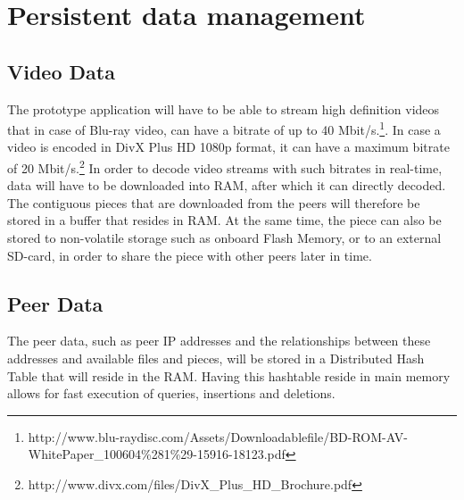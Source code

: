 \section{Persistent data management}
\label{sec:perdata}
\subsection{Video Data}
The prototype application will have to be able to stream high definition videos that in case of Blu-ray video, can have a bitrate of up to 40 Mbit/s.\footnote{http://www.blu-raydisc.com/Assets/Downloadablefile/BD-ROM-AV-WhitePaper_100604\%281\%29-15916-18123.pdf}. In case a video is encoded in DivX Plus HD 1080p format, it can have a maximum bitrate of 20 Mbit/s.\footnote{http://www.divx.com/files/DivX_Plus_HD_Brochure.pdf} In order to decode video streams with such bitrates in real-time, data will have to be downloaded into RAM, after which it can directly decoded. The contiguous pieces that are downloaded from the peers will therefore be stored in a buffer that resides in RAM. At the same time, the piece can also be stored to non-volatile storage such as onboard Flash Memory, or to an external SD-card, in order to share the piece with other peers later in time.
\subsection{Peer Data}
The peer data, such as peer IP addresses and the relationships between these addresses and available files and pieces, will be stored in a Distributed Hash Table that will reside in the RAM. Having this hashtable reside in main memory allows for fast execution of queries, insertions and deletions.



